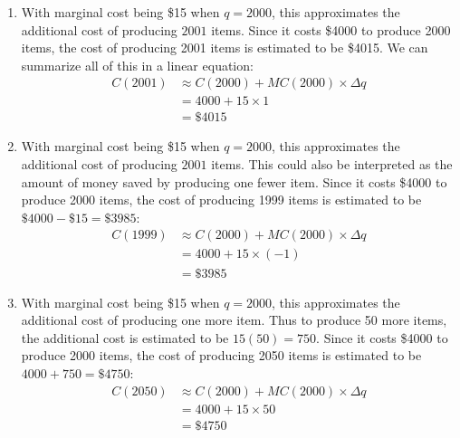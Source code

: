 \documentclass[oneside]{book}
\theoremstyle{definition}
\theoremstyle{solution}
\newtheorem*{solution}{Solution}
\newenvironment{solution}{\vspace{2in}\comment}{\endcomment}
\begin{document}
\begin{solution}
\begin{enumerate}
\item With marginal cost being \$15 when $q = 2000$, this approximates
  the additional cost of producing $2001$ items.  Since it costs
  \$4000 to produce 2000 items, the cost of producing 2001 items is
  estimated to be \$4015.  We can summarize all of this in a linear
  equation:
\begin{align*}
C(2001) & \approx C(2000) + MC(2000) \times \Delta q\\
        & = 4000 + 15 \times 1\\
        & = \boxed{\$4015}
\end{align*}


\item With marginal cost being \$15 when $q = 2000$, this approximates
  the additional cost of producing $2001$ items.  This could also be
  interpreted as the amount of money saved by producing one fewer
  item.  Since it costs \$4000 to produce 2000 items, the cost of
  producing 1999 items is estimated to be
  $\$4000 - \$15 = \$3985$:
\begin{align*}
C(1999) & \approx C(2000) + MC(2000) \times \Delta q\\
        & = 4000 + 15 \times (-1)\\
        & = \boxed{\$3985}
\end{align*}

    
\item With marginal cost being \$15 when $q = 2000$, this approximates
  the additional cost of producing one more item.  Thus to produce 50
  more items, the additional cost is estimated to be $15(50) = 750$.
  Since it costs \$4000 to produce 2000 items, the cost of producing
  2050 items is estimated to be $4000 + 750 = \$4750$:
\begin{align*}
C(2050) & \approx C(2000) + MC(2000) \times \Delta q\\
        & = 4000 + 15 \times 50\\
        & = \boxed{\$4750}
\end{align*}
\end{enumerate}
\end{solution}
\end{document}
